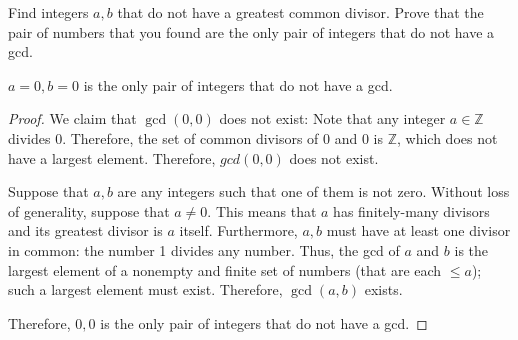 \documentclass{article}
\newcommand{\Z}{\mathbb{Z}}
\theoremstyle{definition}
\begin{document}
\begin{question}
    Find integers $a, b$ that do not have a greatest common divisor.  Prove that the pair of numbers that you found are the only pair of integers that do not have a gcd.
\end{question}
\begin{solution}
$a = 0, b =0$ is the only pair of integers that do not have a gcd.
\begin{proof}
We claim that $\gcd(0, 0)$ does not exist: Note that any integer $a \in \Z$ divides $0$.  Therefore, the set of common divisors of 0 and 0 is $\Z$, which does not have a largest element.  Therefore, $gcd(0, 0)$ does not exist.

Suppose that $a, b$ are any integers such that one of them is not zero.  Without loss of generality, suppose that $a \neq 0$.  This means that $a$ has finitely-many divisors and its greatest divisor is $a$ itself.  Furthermore, $a, b$ must have at least one divisor in common: the number 1 divides any number.  Thus, the gcd of $a$ and $b$ is the largest element of a nonempty and finite set of numbers (that are each $\leq a$); such a largest element must exist.  Therefore, $\gcd(a, b)$ exists.

Therefore, $0, 0$ is the only pair of integers that do not have a gcd.
\end{proof}
\end{solution}
\end{document}
